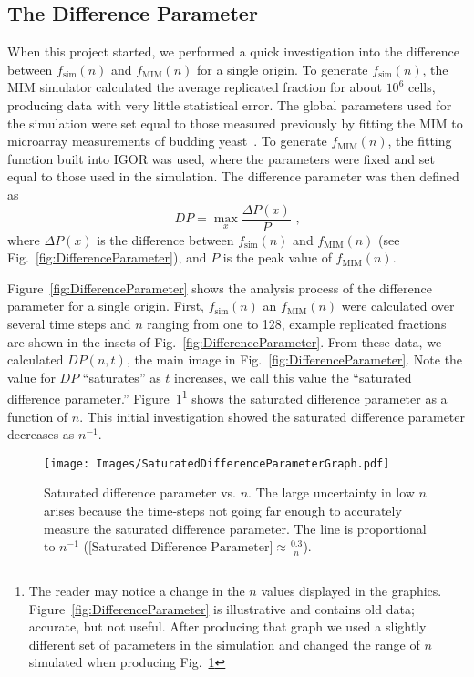 	
		\subsection{The Difference Parameter}
		\label{subsec:earlywork}
		
		When this project started, we performed a quick investigation into the difference between $f_\text{sim}(n)$ and $f_\text{MIM}(n)$ for a single origin.
		To generate $f_\text{sim}(n)$, the MIM simulator calculated the average replicated fraction for about $10^6$ cells, producing data with very little statistical error.
		The global parameters used for the simulation were set equal to those measured previously by fitting the MIM to microarray measurements of budding yeast~\cite{ScottsPaper}.
		To generate $f_\text{MIM}(n)$, the fitting function built into IGOR was used, where the parameters were fixed and set equal to those used in the simulation.
		The difference parameter was then defined as
		\begin{equation} \label{DifferenceParameter}
			DP = \max_{x} {\frac {\Delta P(x)} {P}} \text{ ,}
		\end{equation}
		where $\Delta P(x)$ is the difference between $f_\text{sim}(n)$ and $f_\text{MIM}(n)$ (see Fig.~\ref{fig:DifferenceParameter}), and $P$ is the peak value of $f_\text{MIM}(n)$.
		
		Figure~\ref{fig:DifferenceParameter} shows the analysis process of the difference parameter for a single origin.
		First, $f_\text{sim}(n)$ an $f_\text{MIM}(n)$ were calculated over several time steps and $n$ ranging from one to 128, example replicated fractions are shown in the insets of Fig.~\ref{fig:DifferenceParameter}.
		From these data, we calculated $DP(n,t)$, the main image in Fig.~\ref{fig:DifferenceParameter}.
		Note the value for $DP$ ``saturates'' as $t$ increases, we call this value the ``saturated difference parameter.''
		Figure~\ref{fig:SaturatedDifferenceParameter}\footnote{
		The reader may notice a change in the $n$ values displayed in the graphics. Figure~\ref{fig:DifferenceParameter} is illustrative and contains old data; accurate, but not useful.
		After producing that graph we used a slightly different set of parameters in the simulation and changed the range of $n$ simulated when producing Fig.~\ref{fig:SaturatedDifferenceParameter}}
		shows the saturated difference parameter as a function of $n$.
		This initial investigation showed the saturated difference parameter decreases as $n^{-1}$.
		
		\begin{figure}[tbh]
			\begin{center}
				\texttt{[image: Images/SaturatedDifferenceParameterGraph.pdf]}
			\end{center}
				\caption[Saturated Difference Parameter]{\label{fig:SaturatedDifferenceParameter} Saturated difference parameter vs. $n$.
				The large uncertainty in low $n$ arises because the time-steps not going far enough to accurately measure the saturated difference parameter.
				The line is proportional to $n^{-1}$ ($\text{[Saturated Difference Parameter]} \approx \frac{0.3}{n}$).
				}
		\end{figure}
		
